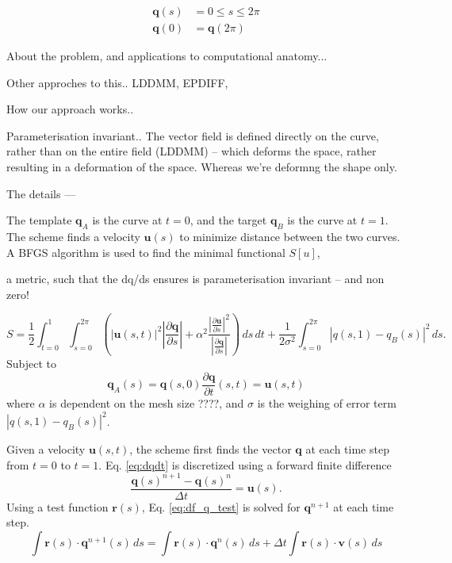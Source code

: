 \documentclass[a4paper, 12pt]{article}
\newcommand{\eq}[1]{Eq. \ref{eq:#1}}
\newcommand{\vect}[1]{\ensuremath{\mathbf{#1}}}
\begin{document}
\begin{align*}
  \vect q(s) &= 0 \leq s \leq 2\pi \\
  \vect q(0) &= \vect q(2\pi)
\end{align*}


About the problem, and applications to computational anatomy...

Other approches to this.. LDDMM, EPDIFF, 

How our approach works..

Parameterisation invariant..
The  vector field is defined directly on the curve, rather than on the entire field (LDDMM) -- which deforms the space, rather resulting in a deformation of the space. Whereas we're deformng the shape only.


The details ---

The template $\vect q_A$ is the curve at $t=0$, and the target $\vect q_B$
is the curve at $t=1$. The scheme finds a velocity $\vect u(s)$ to minimize
distance between the two curves. A BFGS algorithm is used to find the minimal
functional $S[u]$,

a metric, such that the dq/ds ensures is parameterisation invariant -- and non zero!

\begin{equation}
  \label{eq:S}
  S = \frac{1}{2} \int^{1}_{t=0} \int^{2\pi}_{s=0}\left( \left| \vect u(s,t) \right|^2 
  \left| \frac{\partial \vect q}{\partial s} \right|  + 
  \alpha^2 \frac{ 
    \left| \frac{\partial \vect u}{\partial s}\right|^2}{
    \left| \frac{\partial \vect q}{\partial s}\right|}\right)  \,ds\,dt
  + \frac{1}{2\sigma^2}\int^{2\pi}_{s=0}\left| q(s,1) - q_B(s)\right|^2\,ds.
\end{equation}
Subject to
\begin{subequations}
\begin{equation}
  \vect q_A(s) =\vect q(s,0)   \label{eq:template}
\end{equation}
\begin{equation}
  \frac{\partial \vect q}{\partial t}(s,t) = \vect u(s,t)  \label{eq:dqdt}
\end{equation}
\end{subequations}
where $\alpha$ is dependent on the mesh size ????, and $\sigma$ is the weighing
of error term $\left| q(s,1) - q_B(s)\right|^2$.



Given a velocity $\vect u(s,t)$, the scheme first finds the vector $\vect q$ at
each time step from $t=0$ to $t=1$. \eq{dqdt} is discretized using a forward finite difference
\begin{equation}
  \label{eq:fd_q}
  \frac{\vect q(s)^{n+1}- \vect q(s)^n}{\Delta t} = \vect u(s).
\end{equation}
Using a test function $\vect r(s)$, \eq{df_q_test} is solved for $\vect q^{n+1}$
at each time step.
  \begin{equation}
    \label{eq:df_q_test}
    \int \vect{r}(s) \cdot \vect{q}^{n+1}(s)\, ds = \int \vect{r}(s) \cdot
    \vect{q}^n (s)\,ds + \Delta t \int \vect{r}(s)\cdot \vect{v}(s)\, ds
  \end{equation}
\end{document}
